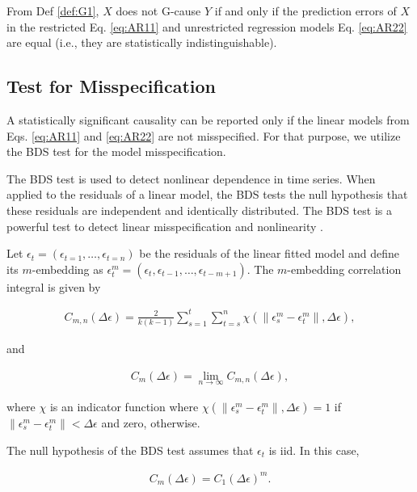 \documentclass[]{book}
\theoremstyle{definition}
\theoremstyle{definition}
\theoremstyle{definition}
\theoremstyle{remark}
\begin{document}
From Def \ref{def:G1}, \(X\) does not G-cause \(Y\) if and only if the
prediction errors of \(X\) in the restricted Eq. \eqref{eq:AR11} and
unrestricted regression models Eq. \eqref{eq:AR22} are equal (i.e., they
are statistically indistinguishable).

\subsection{Test for Misspecification}\label{test-for-misspecification}

A statistically significant causality can be reported only if the linear
models from Eqs. \eqref{eq:AR11} and \eqref{eq:AR22} are not misspecified.
For that purpose, we utilize the BDS test \citep{citeulike:9300127} for
the model misspecification.

The BDS test \citep{citeulike:9300127} is used to detect nonlinear
dependence in time series. When applied to the residuals of a linear
model, the BDS tests the null hypothesis that these residuals are
independent and identically distributed. The BDS test is a powerful test
to detect linear misspecification and nonlinearity
\citep{citeulike:9300127, Barnett97asingle-blind}.

Let \(\epsilon_t = (\epsilon_{t=1}, \ldots, \epsilon_{t=n})\) be the
residuals of the linear fitted model and define its \(m\)-embedding as
\(\epsilon_t^m = (\epsilon_{t}, \epsilon_{t-1}, \ldots, \epsilon_{t-m+1})\).
The \(m\)-embedding correlation integral is given by

\begin{align}
C_{m,n}(\Delta \epsilon) = \frac{2}{k(k-1)}\sum_{s = 1}^{t}{\sum_{t=s}^{n}{ \chi(\| \epsilon_s^m - \epsilon_t^m \|, \Delta \epsilon)    }}, \nonumber
\end{align}

and

\begin{align}
C_{m}(\Delta \epsilon) = \lim_{n\to\infty} C_{m,n}(\Delta \epsilon), \nonumber
\end{align}

where \(\chi\) is an indicator function where
\(\chi(\| \epsilon_s^m - \epsilon_t^m \|, \Delta \epsilon) = 1\) if
\(\| \epsilon_s^m - \epsilon_t^m \| < \Delta \epsilon\) and zero,
otherwise.

The null hypothesis of the BDS test assumes that \(\epsilon_t\) is iid.
In this case,

\begin{align}
C_{m}(\Delta \epsilon) = C_{1}(\Delta \epsilon)^m. \nonumber
\end{align}
\end{document}
